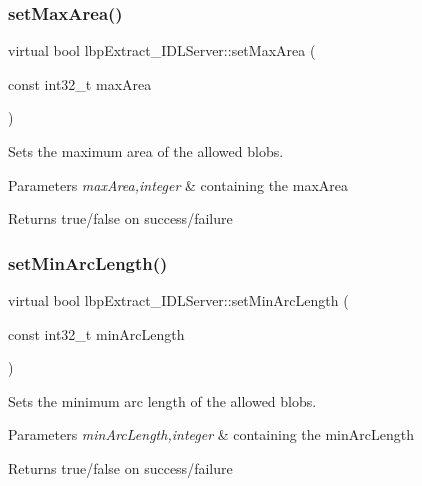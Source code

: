 \subsubsection{\texorpdfstring{setMaxArea()}{setMaxArea()}}
{\footnotesize\ttfamily virtual bool lbp\+Extract\+\_\+\+I\+D\+L\+Server\+::set\+Max\+Area (\begin{DoxyParamCaption}\item[{const int32\+\_\+t}]{max\+Area }\end{DoxyParamCaption})\hspace{0.3cm}{\ttfamily [virtual]}}



Sets the maximum area of the allowed blobs. 


\begin{DoxyParams}{Parameters}
{\em max\+Area,integer} & containing the max\+Area \\
\hline
\end{DoxyParams}
\begin{DoxyReturn}{Returns}
true/false on success/failure 
\end{DoxyReturn}
\mbox{\label{classlbpExtract__IDLServer_abd1ebed4459c05a4b849f8eebea14127}} 
\subsubsection{\texorpdfstring{setMinArcLength()}{setMinArcLength()}}
{\footnotesize\ttfamily virtual bool lbp\+Extract\+\_\+\+I\+D\+L\+Server\+::set\+Min\+Arc\+Length (\begin{DoxyParamCaption}\item[{const int32\+\_\+t}]{min\+Arc\+Length }\end{DoxyParamCaption})\hspace{0.3cm}{\ttfamily [virtual]}}



Sets the minimum arc length of the allowed blobs. 


\begin{DoxyParams}{Parameters}
{\em min\+Arc\+Length,integer} & containing the min\+Arc\+Length \\
\hline
\end{DoxyParams}
\begin{DoxyReturn}{Returns}
true/false on success/failure 
\end{DoxyReturn}
\mbox{\label{classlbpExtract__IDLServer_a13eb918e54b2eee6fe2811fbe8f6aee6}} 
